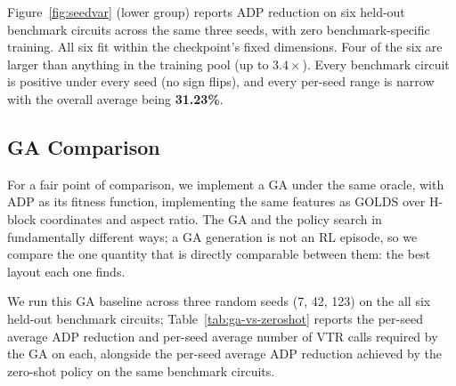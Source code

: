 \documentclass[sigconf]{acmart}
\begin{document}
Figure~\ref{fig:seedvar} (lower group) reports ADP reduction on six held-out
benchmark circuits across the same three seeds, with zero benchmark-specific training.
All six fit within the checkpoint's fixed dimensions.
Four of the six are larger than anything in the training
pool (up to $3.4\times$). Every benchmark circuit is positive under every seed (no sign flips),
and every per-seed range is narrow with the overall average being
\textbf{31.23\%}. 



\subsection{GA Comparison}
\label{sec:results-ga}

For a fair point of comparison, we implement a GA under the same oracle,
with ADP as its fitness function, implementing the same features as
GOLDS over H-block coordinates and aspect ratio. The GA and the policy search in
fundamentally different ways; a GA generation is not an RL episode, so we
compare the one quantity that is directly comparable between them: the best
layout each one finds.

We run this GA baseline across three random seeds (7, 42, 123) on the
all six held-out benchmark circuits; Table~\ref{tab:ga-vs-zeroshot}
reports the per-seed average ADP reduction and per-seed average number of
VTR calls required by the GA on each, alongside the per-seed average ADP
reduction achieved by the zero-shot policy on the same benchmark circuits.

\begin{table}[t]
\centering
\footnotesize
\caption{GA average ADP reduction (\%) and average VTR calls across three
seeds (7, 42, 123), vs.\ zero-shot policy average ADP reduction (\%) over
the same seeds, held-out benchmark circuits.}
\label{tab:ga-vs-zeroshot}
\setlength{\tabcolsep}{3pt}
\end{table}
\end{document}
